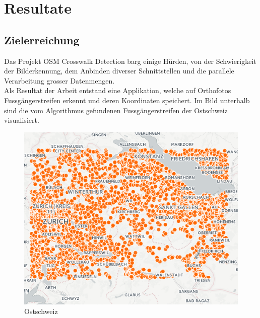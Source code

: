 \newpage
\section{Resultate}
\subsection{Zielerreichung}
Das Projekt OSM Crosswalk Detection barg einige Hürden, von der Schwierigkeit der Bilderkennung, dem Anbinden diverser Schnittstellen und die parallele Verarbeitung grosser Datenmengen.\\
Als Resultat der Arbeit entstand eine Applikation, welche auf Orthofotos Fussgängerstreifen erkennt und deren Koordinaten speichert. Im Bild unterhalb sind die vom Algorithmus gefundenen Fussgängerstreifen der Ostschweiz visualisiert. \\
\begin{figure}[H]
\centering
\includegraphics[width=350pt]{images/ostschweiz.png}
\caption[Ostschweiz]{Ostschweiz}
\end{figure}

